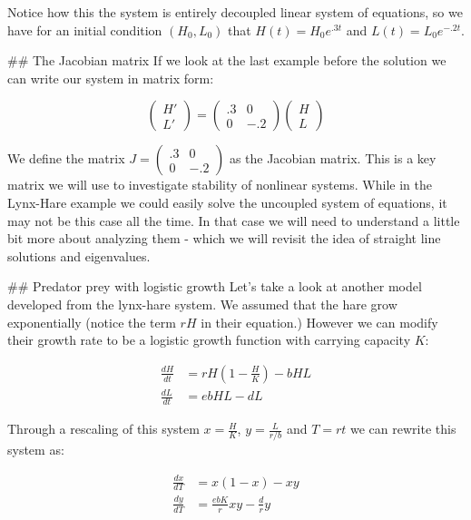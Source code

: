 \documentclass[
]{book}
\theoremstyle{definition}
\theoremstyle{definition}
\theoremstyle{definition}
\theoremstyle{remark}
\begin{document}
Notice how this the system is entirely decoupled linear system of equations, so we have for an initial condition $(H_{0},L_{0})$ that $H(t)=H_{0}e^{.3t}$ and $L(t)=L_{0}e^{-.2t}$.

## The Jacobian matrix
If we look at the last example before the solution we can write our system in matrix form:

\begin{equation}
\begin{pmatrix} H' \\ L' \end{pmatrix} =\begin{pmatrix} .3 & 0 \\ 0 &  -.2 \end{pmatrix} \begin{pmatrix} H \\ L \end{pmatrix}
\end{equation}

We define the matrix $\displaystyle J= \begin{pmatrix} .3 & 0 \\ 0 &  -.2 \end{pmatrix}$ as the Jacobian matrix.  This is a key matrix we will use to investigate stability of nonlinear systems.  While in the Lynx-Hare example we could easily solve the uncoupled system of equations, it may not be this case all the time. In that case we will need to understand a little bit more about analyzing them - which we will revisit the idea of straight line solutions and eigenvalues.

## Predator prey with logistic growth
Let's take a look at another model developed from the lynx-hare system.  We assumed that the hare grow exponentially (notice the term $rH$ in their equation.)  However we can modify their growth rate to be a logistic growth function with carrying capacity $K$:

\begin{align}
\frac{dH}{dt} &= r H \left( 1- \frac{H}{K} \right) - b HL \\
\frac{dL}{dt} &=ebHL -dL
\end{align}

Through a rescaling of this system $\displaystyle x=\frac{H}{K}$, $\displaystyle y=\frac{L}{r/b}$ and $T = r t$ we can rewrite this system as:

\begin{align}
\frac{dx}{d T} &= x(1-x) - xy \\
\frac{dy}{d T} &=\frac{ebK}{r}xy -\frac{d}{r}y
\end{align}
\end{document}
